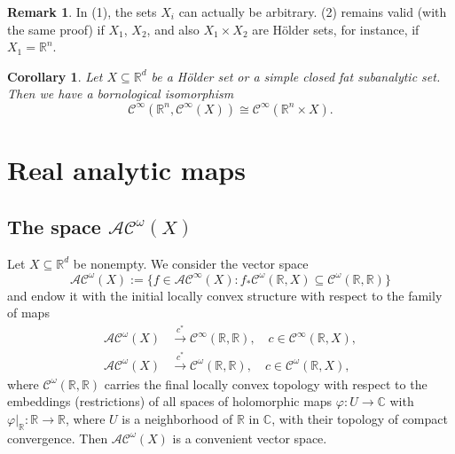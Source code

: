 \documentclass[10pt, reqno]{amsart}
\theoremstyle{plain}
\newtheorem{corollary}[theorem]{Corollary}
\theoremstyle{definition}
\newtheorem{remark}[theorem]{Remark}
\numberwithin{equation}{section}
\def\vh{\varphi}
\def\om{\omega}
\def\C{\mathbb{C}}
\def\R{\mathbb{R}}
\def\cC{\mathcal{C}}
\def\AS{\mathcal{AC}^\infty}
\def\AA{\mathcal{AC}^\omega}
\begin{document}
\begin{remark}
    In (1), the sets $X_i$ can actually be arbitrary.
    (2) remains valid (with the same proof) if $X_1$, $X_2$, and also $X_1 \times X_2$ are H\"older sets, 
    for instance, if $X_1 = \R^n$. 
\end{remark}


\begin{corollary}
    Let $X \subseteq \R^d$ be a H\"older set or a simple closed fat subanalytic set.
    Then we have a bornological isomorphism
    \[
        \cC^\infty(\R^n,\cC^\infty(X)) \cong \cC^\infty(\R^n \times X).
    \]
\end{corollary}


\section{Real analytic maps} \label{sec:analytic}


\subsection{The space \texorpdfstring{$\AA(X)$}{AComega(X)}}

Let $X \subseteq \R^d$ be nonempty.
We consider the vector space
\[
    \AA(X) := \{f \in \AS(X) : f_* \cC^\om(\R,X) \subseteq \cC^\om(\R,\R)\}
\]
and endow it with the initial locally convex structure with respect to the family of maps
\begin{align*}
    \AA(X) &\stackrel{c^*}{\longrightarrow} \cC^\infty(\R,\R), \quad c \in \cC^\infty(\R,X), 
    \\
    \AA(X) &\stackrel{c^*}{\longrightarrow} \cC^\om(\R,\R), \quad c \in \cC^\om(\R,X), 
\end{align*}
where $\cC^\om(\R,\R)$ carries the final locally convex topology with respect to the embeddings 
(restrictions) of all spaces of holomorphic maps $\vh : U \to \C$ with $\vh|_\R : \R \to \R$, where $U$ is a neighborhood
of $\R$ in $\C$, with their topology of compact convergence.
Then $\AA(X)$ is a convenient vector space.
\end{document}
